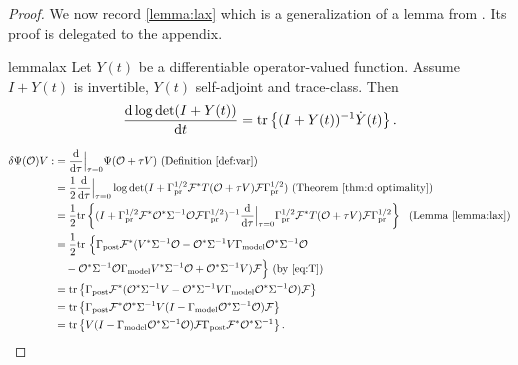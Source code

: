 \begin{proof}
  We now record \ref{lemma:lax} which is a generalization of a
  lemma from \cite{Lax07}. Its proof is delegated to the appendix.
  \begin{restatable*}{lemma}{lax}\label{lemma:lax}
    Let $Y(t)$ be a differentiable operator-valued function. Assume 
    $I+Y(t)$ is invertible, $Y(t)$ self-adjoint and trace-class. Then
    \begin{equation*}
      \frac{\der \log \det (I+Y(t))}{\der t} = \tr{(I+Y(t))^{-1} \dot{Y}(t)}.
    \end{equation*}
  \end{restatable*}

  \begin{align*}
    \begin{split}
      \delta \tar(\obs) V 
      :&= \frac{\der}{\der\tau} \Big |_{\tau=0} \tar(\obs + \tau V) \text{ (Definition \ref{def:var})}\\
      &= \frac12 \frac{\der}{\der \tau} \Big |_{\tau=0} \log \det 
      (I + \prcov^{1/2} \fwd^* T(\obs+\tau V)\fwd \prcov^{1/2} ) \text{ (Theorem \ref{thm:d optimality})} \\
      &= \frac12 \tr{( I + \prcov^{1/2} \fwd^* \obs^* \Sigma^{-1}
        \obs\fwd \prcov^{1/2} )^{-1}
        \frac{\der}{\der \tau} \Big |_{\tau=0}
        \prcov^{1/2} \fwd^* T(\obs+\tau V) \fwd \prcov^{1/2}}\ \text{ (Lemma \ref{lemma:lax})} \\
      &= \frac12 \ttr\Big \{ \postcov \fwd^* (V^* \Sigma^{-1} \obs 
      - \obs^*\Sigma^{-1} V\modcov \obs^* \Sigma^{-1}\obs \\
      &\ \ \ - \obs^* \Sigma^{-1} \obs \modcov V^* \Sigma^{-1}\obs 
      + \obs^* \Sigma^{-1} V ) \fwd \Big \}  \text{ (by \eqref{eq:T})} \\
      &= \tr{\postcov \fwd^* ( \obs^* \Sigma^{-1} V -
      \obs^*\Sigma^{-1} V\modcov \obs^* \Sigma^{-1}\obs ) \fwd} \\
      &= \tr{\postcov \fwd^* \obs^* \Sigma^{-1} V 
      ( I - \modcov \obs^* \Sigma^{-1}\obs ) \fwd} \\
      &= \tr{V ( I - \modcov \obs^* \Sigma^{-1}\obs )
      \fwd \postcov \fwd^* \obs^* \Sigma^{-1}}.
    \end{split}
  \end{align*} 
\end{proof}



